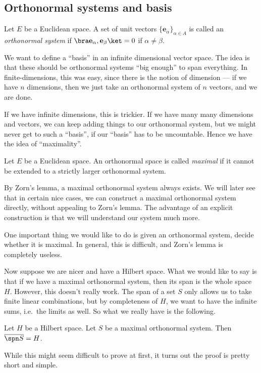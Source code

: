 \documentclass[a4paper]{article}
\begin{document}
\subsection{Orthonormal systems and basis}
\begin{defi}
  Let $E$ be a Euclidean space. A set of unit vectors $\{\mathbf{e}_\alpha\}_{\alpha \in A}$ is called an \emph{orthonormal system} if $\bra \mathbf{e}_\alpha, \mathbf{e}_\beta\ket = 0$ if $\alpha \not= \beta$.
\end{defi}

We want to define a ``basis'' in an infinite dimensional vector space. The idea is that these should be orthonormal systems ``big enough'' to span everything. In finite-dimensions, this was easy, since there is the notion of dimension --- if we have $n$ dimensions, then we just take an orthonormal system of $n$ vectors, and we are done.

If we have infinite dimensions, this is trickier. If we have many many dimensions and vectors, we can keep adding things to our orthonormal system, but we might never get to such a ``basis'', if our ``basis'' has to be uncountable. Hence we have the idea of ``maximality''.

\begin{defi}
  Let $E$ be a Euclidean space. An orthonormal space is called \emph{maximal} if it cannot be extended to a strictly larger orthonormal system.
\end{defi}
By Zorn's lemma, a maximal orthonormal system always exists. We will later see that in certain nice cases, we can construct a maximal orthonormal system directly, without appealing to Zorn's lemma. The advantage of an explicit construction is that we will understand our system much more.

One important thing we would like to do is given an orthonormal system, decide whether it is maximal. In general, this is difficult, and Zorn's lemma is completely useless.

Now suppose we are nicer and have a Hilbert space. What we would like to say is that if we have a maximal orthonormal system, then its span is the whole space $H$. However, this doesn't really work. The span of a set $S$ only allows us to take finite linear combinations, but by completeness of $H$, we want to have the infinite sums, i.e.\ the limits as well. So what we really have is the following.

\begin{prop}
  Let $H$ be a Hilbert space. Let $S$ be a maximal orthonormal system. Then $\overline{\spn S} = H$.
\end{prop}
While this might seem difficult to prove at first, it turns out the proof is pretty short and simple.
\end{document}
